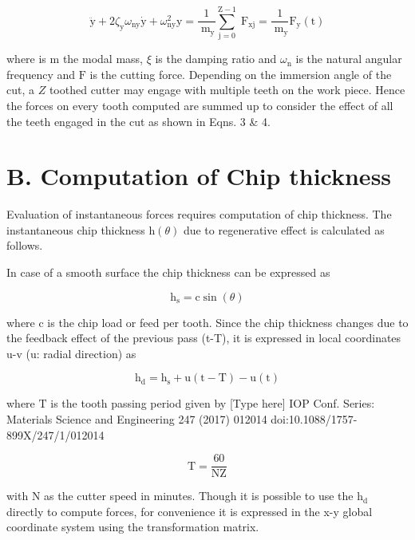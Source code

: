 \documentclass[10pt]{article}
\begin{document}
\[
\ddot{\mathrm{y}} + 2{\zeta }_{\mathrm{y}}{\omega }_{\mathrm{{ny}}}\dot{\mathrm{y}} + {\omega }_{\mathrm{{ny}}}^{2}\mathrm{y} = \frac{1}{{\mathrm{\;m}}_{\mathrm{y}}}\mathop{\sum }\limits_{{\mathrm{j} = 0}}^{{\mathrm{Z} - 1}}{\mathrm{\;F}}_{\mathrm{{xj}}} = \frac{1}{{\mathrm{\;m}}_{\mathrm{y}}}{\mathrm{F}}_{\mathrm{y}}\left( \mathrm{t}\right)  \tag{4}
\]

where is \(\mathrm{m}\) the modal mass, \(\xi\) is the damping ratio and \({\omega }_{\mathrm{n}}\) is the natural angular frequency and \(\mathrm{F}\) is the cutting force. Depending on the immersion angle of the cut, a \(Z\) toothed cutter may engage with multiple teeth on the work piece. Hence the forces on every tooth computed are summed up to consider the effect of all the teeth engaged in the cut as shown in Eqns. 3 \& 4.

\section*{B. Computation of Chip thickness}

Evaluation of instantaneous forces requires computation of chip thickness. The instantaneous chip thickness \(\mathrm{h}\left( \theta \right)\) due to regenerative effect is calculated as follows.

In case of a smooth surface the chip thickness can be expressed as

\[
{\mathrm{h}}_{\mathrm{s}} = \mathrm{c}\sin \left( \theta \right)  \tag{5}
\]

where \(\mathrm{c}\) is the chip load or feed per tooth. Since the chip thickness changes due to the feedback effect of the previous pass (t-T), it is expressed in local coordinates u-v (u: radial direction) as

\[
{\mathrm{h}}_{\mathrm{d}} = {\mathrm{h}}_{\mathrm{s}} + \mathrm{u}\left( {\mathrm{t} - \mathrm{T}}\right)  - \mathrm{u}\left( \mathrm{t}\right)  \tag{6}
\]

where \(\mathrm{T}\) is the tooth passing period given by [Type here] IOP Conf. Series: Materials Science and Engineering 247 (2017) 012014 doi:10.1088/1757-899X/247/1/012014

\[
\mathrm{T} = \frac{60}{\mathrm{{NZ}}} \tag{7}
\]

with \(\mathrm{N}\) as the cutter speed in minutes. Though it is possible to use the \({\mathrm{h}}_{\mathrm{d}}\) directly to compute forces, for convenience it is expressed in the x-y global coordinate system using the transformation matrix.
\end{document}
